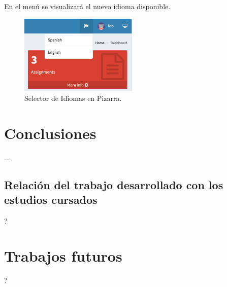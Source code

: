 \documentclass[11pt,spanish,listoffigures,listoftables]{tfgetsinf}
\begin{document}
En el menú se visualizará el nuevo idioma disponible.

\begin{figure}[ht]
	\centering
	\includegraphics[width=0.50\textwidth]{img/pizarra-new-language}
	\caption[Selector de Idiomas en Pizarra]{Selector de Idiomas en Pizarra.}
	\label{figura:pizarra-new-language}
\end{figure}




\chapter{Conclusiones}

... \par

\section{Relación del trabajo desarrollado con los estudios cursados}

?

\chapter{Trabajos futuros}

?
\end{document}
